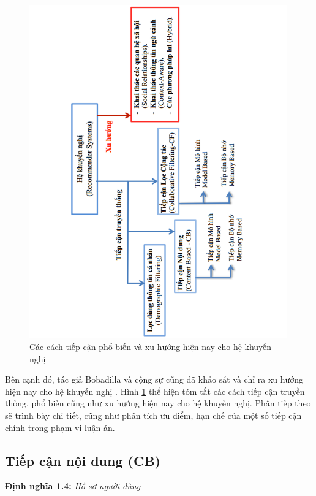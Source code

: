 \begin{figure}[ht]
\begin{center}
\advance\leftskip-3cm
\advance\rightskip-3cm
  \includegraphics[width=0.99\textwidth]{Figure_1_7.pdf}
  \caption{Các cách tiếp cận phổ biến và xu hướng hiện nay cho hệ khuyến nghị}\label{fig:figure_1_7}
\end{center}
\end{figure}

Bên cạnh đó, tác giả Bobadilla và cộng sự cũng đã khảo sát và chỉ ra xu hướng hiện nay cho hệ khuyến nghị \cite{Bobadilla2013109}. Hình \ref{fig:figure_1_7} thể hiện tóm tắt các cách tiếp cận truyền thống, phổ biến cũng như xu hướng hiện nay cho hệ khuyến nghị. Phân tiếp theo sẽ trình bày chi tiết, cũng như phân tích ưu điểm, hạn chế của một số tiếp cận chính trong phạm vi luận án.

\subsection{Tiếp cận nội dung (CB)}
\textbf{Định nghĩa 1.4:} \textit{Hồ sơ người dùng}

